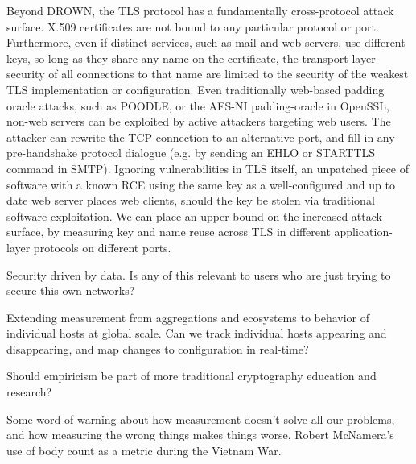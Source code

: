 Beyond DROWN, the TLS protocol has a fundamentally cross-protocol attack
surface. X.509 certificates are not bound to any particular protocol or port.
Furthermore, even if distinct services, such as mail and web servers, use
different keys, so long as they share any name on the certificate, the
transport-layer security of all connections to that name are limited to the
security of the weakest TLS implementation or configuration. Even traditionally
web-based padding oracle attacks, such as POODLE, or the AES-NI padding-oracle
in OpenSSL, non-web servers can be exploited by active attackers targeting web
users. The attacker can rewrite the TCP connection to an alternative port, and
fill-in any pre-handshake protocol dialogue (e.g. by sending an EHLO or
STARTTLS command in SMTP). Ignoring vulnerabilities in TLS itself, an unpatched
piece of software with a known RCE using the same key as a well-configured and
up to date web server places web clients, should the key be stolen via
traditional software exploitation. We can place an upper bound on the increased
attack surface, by measuring key and name reuse across TLS in different
application-layer protocols on different ports.

Security driven by data. Is any of this relevant to users who are just trying
to secure this own networks?

Extending measurement from aggregations and ecosystems to behavior of
individual hosts at global scale. Can we track individual hosts appearing and
disappearing, and map changes to configuration in real-time?

Should empiricism be part of more traditional cryptography education and research?

Some word of warning about how measurement doesn't solve all our problems,
and how measuring the wrong things makes things worse, \eg Robert McNamera's
use of body count as a metric during the Vietnam War.



